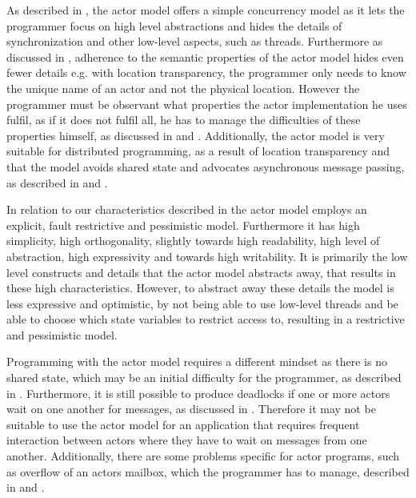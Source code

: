 As described in , the actor model offers a simple concurrency model as it lets the programmer focus on high level abstractions and hides the details of synchronization and other low-level aspects, such as threads. Furthermore as discussed in , adherence to the semantic properties of the actor model hides even fewer details e.g. with location transparency, the programmer only needs to know the unique name of an actor and not the physical location. However the programmer must be observant what properties the actor implementation he uses fulfil, as if it does not fulfil all, he has to manage the difficulties of these properties himself, as discussed in  and . Additionally, the actor model is very suitable for distributed programming, as a result of location transparency and that the model avoids shared state and advocates asynchronous message passing, as described in  and .

In relation to our characteristics described in  the actor model employs an explicit, fault restrictive and pessimistic model. Furthermore it has high simplicity, high orthogonality, slightly towards high readability, high level of abstraction, high expressivity and towards high writability. It is primarily the low level constructs and details that the actor model abstracts away, that results in these high characteristics. However, to abstract away these details the model is less expressive and optimistic, by not being able to use low-level threads and be able to choose which state variables to restrict access to, resulting in a restrictive and pessimistic model.

Programming with the actor model requires a different mindset as there is no shared state, which may be an initial difficulty for the programmer, as described in . Furthermore, it is still possible to produce deadlocks if one or more actors wait on one another for messages, as discussed in . Therefore it may not be suitable to use the actor model for an application that requires frequent interaction between actors where they have to wait on messages from one another. Additionally, there are some problems specific for actor programs, such as overflow of an actors mailbox, which the programmer has to manage, described in  and . 

